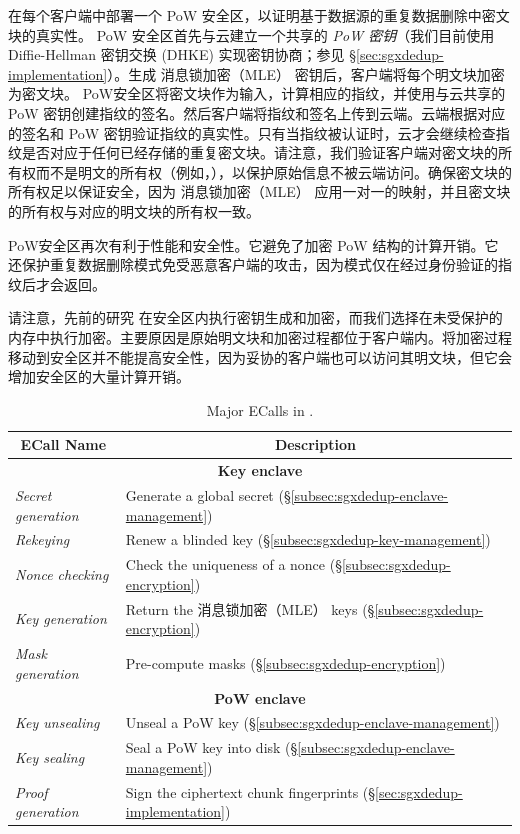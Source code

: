 \sysnameS 在每个客户端中部署一个 PoW 安全区，以证明基于数据源的重复数据删除中密文块的真实性。 PoW 安全区首先与云建立一个共享的 \textit{ PoW 密钥}（我们目前使用 Diffie-Hellman 密钥交换 (DHKE) 实现密钥协商；参见 \S\ref{sec:sgxdedup-implementation}）。生成 消息锁加密（MLE） 密钥后，客户端将每个明文块加密为密文块。 PoW安全区将密文块作为输入，计算相应的指纹，并使用与云共享的 PoW 密钥创建指纹的签名。然后客户端将指纹和签名上传到云端。云端根据对应的签名和 PoW 密钥验证指纹的真实性。只有当指纹被认证时，云才会继续检查指纹是否对应于任何已经存储的重复密文块。请注意，我们验证客户端对密文块的所有权而不是明文的所有权（例如，\cite{halevi11}），以保护原始信息不被云端访问。确保密文块的所有权足以保证安全，因为 消息锁加密（MLE） 应用一对一的映射，并且密文块的所有权与对应的明文块的所有权一致。

PoW安全区再次有利于性能和安全性。它避免了加密 PoW 结构的计算开销。它还保护重复数据删除模式免受恶意客户端的攻击，因为模式仅在经过身份验证的指纹后才会返回。

请注意，先前的研究 \cite{kim19,fuhry20,djoko19} 在安全区内执行密钥生成和加密，而我们选择在未受保护的内存中执行加密。主要原因是原始明文块和加密过程都位于客户端内。将加密过程移动到安全区并不能提高安全性，因为妥协的客户端也可以访问其明文块，但它会增加安全区的大量计算开销。

\begin{table}[t]
\small
\centering
\begin{tabular}{|l|l|}
\hline
\multicolumn{1}{|c|}{\bf ECall Name} & \multicolumn{1}{c|}{\bf Description}\\ 
\hline
\hline
\multicolumn{2}{|c|}{\bf Key enclave} \\
\hline
\textit{ Secret generation} & Generate a global secret 
(\S\ref{subsec:sgxdedup-enclave-management}) \\
\hline
\textit{ Rekeying} & Renew a blinded key 
(\S\ref{subsec:sgxdedup-key-management}) \\
\hline
\textit{ Nonce checking} & Check the uniqueness of a nonce 
(\S\ref{subsec:sgxdedup-encryption}) \\
\hline
\textit{ Key generation} & Return the 消息锁加密（MLE） keys (\S\ref{subsec:sgxdedup-encryption}) \\
\hline
\textit{ Mask generation} & Pre-compute masks (\S\ref{subsec:sgxdedup-encryption}) \\
\hline
\multicolumn{2}{|c|}{\bf PoW enclave} \\
\hline
  \textit{ Key unsealing} & Unseal a PoW key (\S\ref{subsec:sgxdedup-enclave-management}) \\
\hline
  \textit{ Key sealing} & Seal a PoW key into disk (\S\ref{subsec:sgxdedup-enclave-management})
\\
\hline
\textit{ Proof generation} & Sign the ciphertext chunk fingerprints 
(\S\ref{sec:sgxdedup-implementation}) \\
\hline
\end{tabular}
\vspace{-6pt}
\caption{Major ECalls in \sysnameS.}
\label{tab:sgxdedup-ecall}
\vspace{-3pt}
\end{table}


